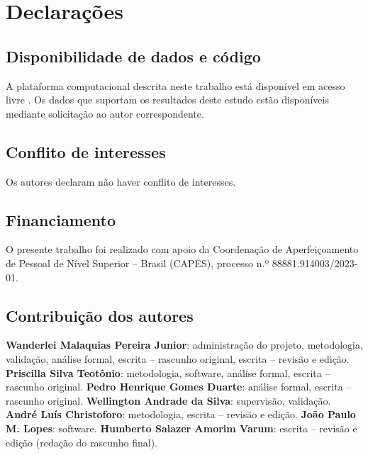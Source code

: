 \section*{Declarações}

\subsection*{Disponibilidade de dados e código}
A plataforma computacional descrita neste trabalho está disponível em acesso livre \parencite{ReliaBridge2026}. Os dados que suportam os resultados deste estudo estão disponíveis mediante solicitação ao autor correspondente.

\subsection*{Conflito de interesses}
Os autores declaram não haver conflito de interesses.

\subsection*{Financiamento}
O presente trabalho foi realizado com apoio da Coordenação de Aperfeiçoamento de Pessoal de Nível Superior -- Brasil (CAPES), processo n.º 88881.914003/2023-01.

\subsection*{Contribuição dos autores}
\textbf{Wanderlei Malaquias Pereira Junior}: administração do projeto, metodologia, validação, análise formal, escrita -- rascunho original, escrita -- revisão e edição.
\textbf{Priscilla Silva Teotônio}: metodologia, software, análise formal, escrita -- rascunho original.
\textbf{Pedro Henrique Gomes Duarte}: análise formal, escrita -- rascunho original.
\textbf{Wellington Andrade da Silva}: supervisão, validação.
\textbf{André Luís Christoforo}: metodologia, escrita -- revisão e edição.
\textbf{João Paulo M. Lopes}: software.
\textbf{Humberto Salazer Amorim Varum}: escrita -- revisão e edição (redação do rascunho final).
